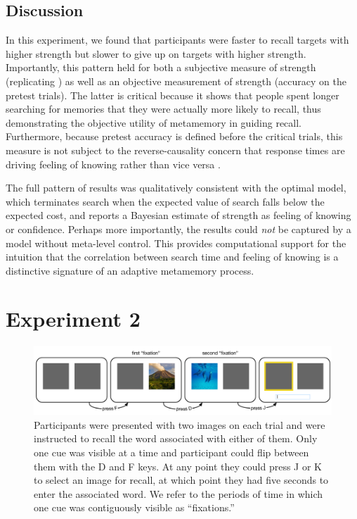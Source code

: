 \subsection{Discussion}

In this experiment, we found that participants were faster to recall targets with higher strength but slower to give up on targets with higher strength. Importantly, this pattern held for both a subjective measure of strength (replicating \citealp{costermans1992confidence}) as well as an objective measurement of strength (accuracy on the pretest trials). The latter is critical because it shows that people spent longer searching for memories that they were actually more likely to recall, thus demonstrating the objective utility of metamemory in guiding recall. Furthermore, because pretest accuracy is defined before the critical trials, this measure is not subject to the reverse-causality concern that response times are driving feeling of knowing rather than vice versa \citep{schwartz2001relation}. 

The full pattern of results was qualitatively consistent with the optimal model, which terminates search when the expected value of search falls below the expected cost, and reports a Bayesian estimate of strength as feeling of knowing or confidence. Perhaps more importantly, the results could \emph{not} be captured by a model without meta-level control. This provides computational support for the intuition that the correlation between search time and feeling of knowing is a distinctive signature of an adaptive metamemory process.

\section{Experiment 2}

\begin{figure}[t!]
  \centering
  \includegraphics[width=\textwidth]{figs/memory/task_exp2.pdf}
  \caption{ Participants were presented with two images on each trial and were instructed to recall the word associated with either of them. Only one cue was visible at a time and participant could flip between them with the D and F keys. At any point they could press J or K to select an image for recall, at which point they had five seconds to enter the associated word. We refer to the periods of time in which one cue was contiguously visible as ``fixations.''}
  \label{fig:task-exp2}
\end{figure}


